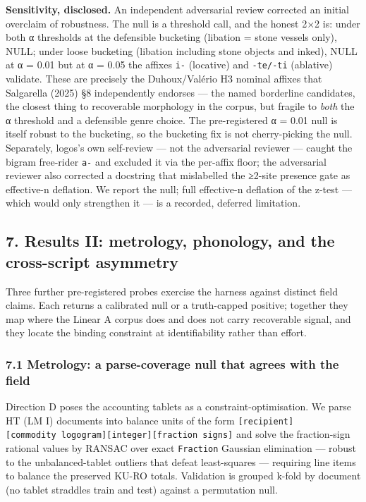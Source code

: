 \documentclass[
  10pt,
]{article}
\begin{document}
\textbf{Sensitivity, disclosed.} An independent adversarial review
corrected an initial overclaim of robustness. The null is a threshold
call, and the honest 2×2 is: under both α thresholds at the defensible
bucketing (libation = stone vessels only), NULL; under loose bucketing
(libation including stone objects and inked), NULL at α = 0.01 but at α
= 0.05 the affixes \texttt{i-} (locative) and \texttt{-te/-ti}
(ablative) validate. These are precisely the Duhoux/Valério H3 nominal
affixes that Salgarella (2025) §8 independently endorses --- the named
borderline candidates, the closest thing to recoverable morphology in
the corpus, but fragile to \emph{both} the α threshold and a defensible
genre choice. The pre-registered α = 0.01 null is itself robust to the
bucketing, so the bucketing fix is not cherry-picking the null.
Separately, logos's own self-review --- not the adversarial reviewer ---
caught the bigram free-rider \texttt{a-} and excluded it via the
per-affix floor; the adversarial reviewer also corrected a docstring
that mislabelled the ≥2-site presence gate as effective-n deflation. We
report the null; full effective-n deflation of the z-test --- which
would only strengthen it --- is a recorded, deferred limitation.

\hypertarget{results-ii-metrology-phonology-and-the-cross-script-asymmetry}{%
\subsection{7. Results II: metrology, phonology, and the cross-script
asymmetry}\label{results-ii-metrology-phonology-and-the-cross-script-asymmetry}}

Three further pre-registered probes exercise the harness against
distinct field claims. Each returns a calibrated null or a truth-capped
positive; together they map where the Linear A corpus does and does not
carry recoverable signal, and they locate the binding constraint at
identifiability rather than effort.

\hypertarget{metrology-a-parse-coverage-null-that-agrees-with-the-field}{%
\subsubsection{7.1 Metrology: a parse-coverage null that agrees with the
field}\label{metrology-a-parse-coverage-null-that-agrees-with-the-field}}

Direction D poses the accounting tablets as a constraint-optimisation.
We parse HT (LM I) documents into balance units of the form
\texttt{{[}recipient{]}{[}commodity\ logogram{]}{[}integer{]}{[}fraction\ signs{]}}
and solve the fraction-sign rational values by RANSAC over exact
\texttt{Fraction} Gaussian elimination --- robust to the
unbalanced-tablet outliers that defeat least-squares --- requiring line
items to balance the preserved KU-RO totals. Validation is grouped
k-fold by document (no tablet straddles train and test) against a
permutation null.
\end{document}
